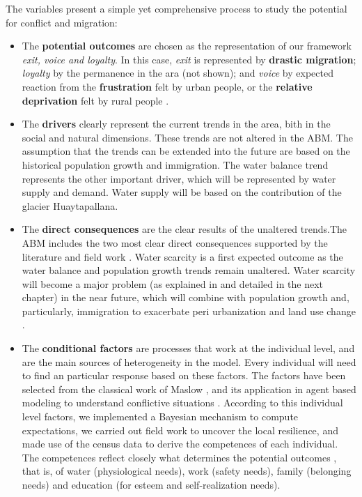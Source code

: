 \documentclass[doc,12pt,floatsintext]{apa7}
\begin{document}
The variables present a simple yet comprehensive process to study the potential for conflict and migration:
\begin{itemize}
\item The {\bf potential outcomes} are chosen as the representation of our framework \emph{exit, voice and loyalty}\parencite{hirschman_exit_1970}. In this case, \emph{exit} is represented by {\bf drastic migration}; \emph{loyalty} by the permanence in the ara (not shown); and \emph{voice} by expected reaction from the {\bf frustration} felt by urban people, or the {\bf relative deprivation} felt by rural people .

\item The {\bf drivers} clearly represent the current trends in the area, bith  in the social and natural dimensions. These trends are not altered in the ABM. The assumption that the trends can be extended into the future are based on the historical population growth and immigration. The water balance trend represents the other important driver, which will be represented by water supply and demand. Water supply will be based on the contribution of the glacier Huaytapallana.

\item The {\bf direct consequences} are the clear results of the unaltered trends.The ABM includes the two most clear direct consequences supported by the literature and field work \parencite{haller_huancayo_2013,Ho2012,haller_vivid_2012}. Water scarcity is a first expected outcome as the water balance and population growth trends remain unaltered. Water scarcity will become a major problem (as explained in \parencite{carlos_riesgos_2012} and detailed in the next chapter) in the near future, which will combine with population growth and, particularly, immigration to exacerbate peri urbanization and land use change \parencite{haller_huancayo_2013,haller_vivid_2012,Ho2012}.

\item The {\bf conditional factors} are processes that work at the individual level, and are the main sources of heterogeneity in the model. Every individual will need to find an particular response based on these factors. The factors have been selected from the classical work of Maslow \parencite{maslow_motivation_1987},  and its application in agent based modeling to understand conflictive situations \parencite{watkins_understanding_2008}. According to this individual level factors, we implemented a Bayesian mechanism to compute expectations, we carried out field work to uncover the local resilience, and made use of the census data to derive the competences of each individual. The competences reflect closely what determines the potential outcomes \parencite{watkins_understanding_2008}, that is, of water (physiological needs), work (safety needs), family (belonging needs) and education (for esteem and self-realization needs).


\end{itemize}
\end{document}
